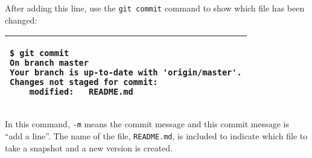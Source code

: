 After adding this line, use the {\tt git commit} command to show which file
has been changed:

\vspace{0.2in}

\noindent
\begin{tabular}{|p{5in}|}\hline
\begin{verbatim}
$ git commit
On branch master
Your branch is up-to-date with 'origin/master'.
Changes not staged for commit:
	modified:   README.md
\end{verbatim}
\\ \hline
\end{tabular}
\vspace{0.2in}

What does this mean? It says a file {\tt README.md} has been changed
but it has not been committed. The next question is the difference
between changes and commit.  Modifications are often reviewed and
revised multiple times; these changes are transient and do not need to
be recorded in the repository.  When the modifications are
satisfactory, the file is ready to ``take a snapshot'' by creating a
new version.  The command to take a snapshot is {\tt git commit}.
\index{git!commit}

The earlier {\tt git commit} shows the candidate(s) for commit.  A
candidate can be a files that has been modified ({\tt README.md} in
this example).  This command has not committed any changes yet and has
not created a new version. To commit the change of a specific file, it
is necessary adding the file's name as shown in the following example

\vspace{0.2in}

\noindent
\begin{tabular}{|p{5in}|}\hline
\begin{verbatim}
$ git commit -m "add a line" README.md 
[master 26317f0] add a line
 1 file changed, 2 insertions(+)
\end{verbatim}
\\ \hline
\end{tabular}
\vspace{0.2in}


In this command, {\tt -m} means the commit message and this commit
message is ``add a line''.  The name of the file, {\tt README.md}, is
included to indicate which file to take a snapshot and a new version
is created.

